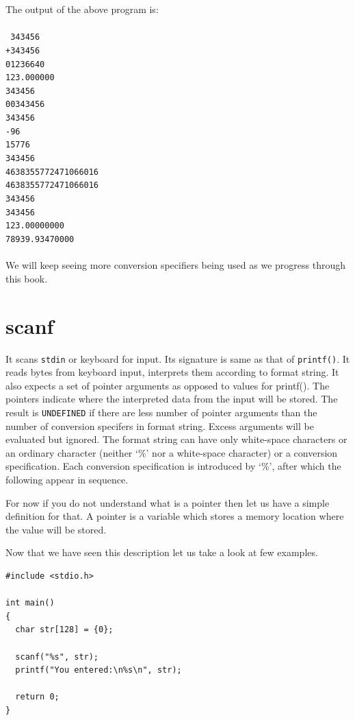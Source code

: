 The output of the above program is:
\\\\\texttt{ 343456\\
+343456\\
01236640\\
123.000000\\
343456\\
00343456\\
  343456\\
-96\\
15776\\
343456\\
4638355772471066016\\
4638355772471066016\\
343456\\
343456\\
123.00000000\\
78939.93470000\\\\}
We will keep seeing more conversion specifiers being used as we progress
through this book.

\section{scanf}
It scans \texttt{stdin} or keyboard for input. Its signature is same as that of
\texttt{printf()}. It reads bytes from keyboard input, interprets them
according to format string. It also expects a set of pointer arguments as
opposed to values for printf(). The pointers indicate where the interpreted
data from the input will be stored. The result is \texttt{UNDEFINED} if there
are less number of pointer arguments than the number of conversion specifers in
format string. Excess arguments will be evaluated but ignored. The format
string can have only white-space characters or an ordinary character (neither
`\%' nor a white-space character) or a conversion specification. Each
conversion specification is introduced by `\%', after which the following
appear in sequence.

For now if you do not understand what is a pointer then let us have a simple
definition for that. A pointer is a variable which stores a memory location
where the value will be stored.

Now that we have seen this description let us take a look at few examples.

\begin{Verbatim}[frame=single]
#include <stdio.h>

int main()
{
  char str[128] = {0};

  scanf("%s", str);
  printf("You entered:\n%s\n", str);

  return 0;
}
\end{Verbatim}

